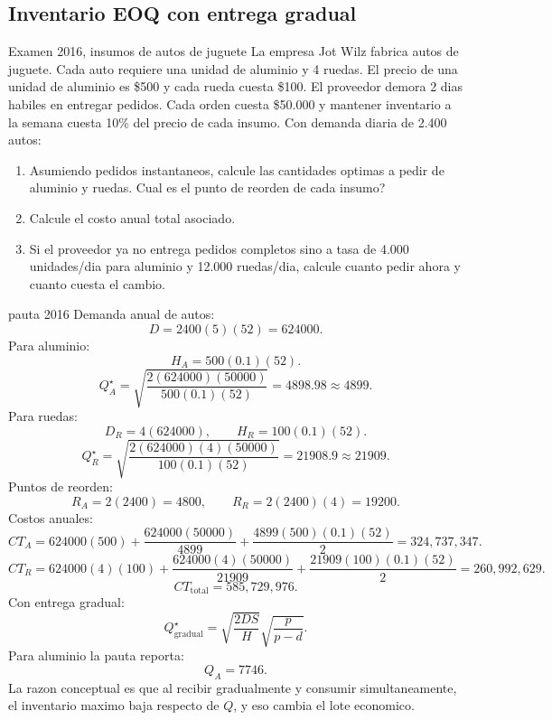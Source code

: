 \subsection{Inventario EOQ con entrega gradual}

\begin{enunciado}{Examen 2016, insumos de autos de juguete}
La empresa Jot Wilz fabrica autos de juguete. Cada auto requiere una unidad de aluminio y 4 ruedas. El precio de una unidad de aluminio es \$500 y cada rueda cuesta \$100. El proveedor demora 2 dias habiles en entregar pedidos. Cada orden cuesta \$50.000 y mantener inventario a la semana cuesta 10\% del precio de cada insumo. Con demanda diaria de 2.400 autos:

\begin{enumerate}[label=\alph*)]
  \item Asumiendo pedidos instantaneos, calcule las cantidades optimas a pedir de aluminio y ruedas. Cual es el punto de reorden de cada insumo?
  \item Calcule el costo anual total asociado.
  \item Si el proveedor ya no entrega pedidos completos sino a tasa de 4.000 unidades/dia para aluminio y 12.000 ruedas/dia, calcule cuanto pedir ahora y cuanto cuesta el cambio.
\end{enumerate}
\end{enunciado}

\begin{pautacompleta}{pauta 2016}
Demanda anual de autos:
\[
  D=2400(5)(52)=624000.
\]
Para aluminio:
\[
  H_A=500(0.1)(52).
\]
\[
  Q_A^\star=\sqrt{\frac{2(624000)(50000)}{500(0.1)(52)}}=4898.98\approx 4899.
\]
Para ruedas:
\[
  D_R=4(624000),\qquad H_R=100(0.1)(52).
\]
\[
  Q_R^\star=\sqrt{\frac{2(624000)(4)(50000)}{100(0.1)(52)}}=21908.9\approx 21909.
\]
Puntos de reorden:
\[
  R_A=2(2400)=4800,
  \qquad
  R_R=2(2400)(4)=19200.
\]
Costos anuales:
\[
  CT_A=624000(500)+\frac{624000(50000)}{4899}
  +\frac{4899(500)(0.1)(52)}{2}=324{,}737{,}347.
\]
\[
  CT_R=624000(4)(100)+\frac{624000(4)(50000)}{21909}
  +\frac{21909(100)(0.1)(52)}{2}=260{,}992{,}629.
\]
\[
  CT_{\text{total}}=585{,}729{,}976.
\]
Con entrega gradual:
\[
  Q^\star_{\text{gradual}}=\sqrt{\frac{2DS}{H}}\sqrt{\frac{p}{p-d}}.
\]
Para aluminio la pauta reporta:
\[
  Q_A=7746.
\]
La razon conceptual es que al recibir gradualmente y consumir simultaneamente, el inventario maximo baja respecto de $Q$, y eso cambia el lote economico.
\end{pautacompleta}

